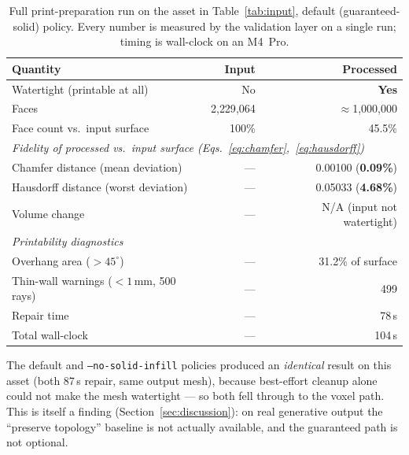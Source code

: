\documentclass[11pt,a4paper]{article}
\begin{document}
\begin{table}[h]
\centering
\caption{Full print-preparation run on the asset in Table~\ref{tab:input},
default (guaranteed-solid) policy. Every number is measured by the validation
layer on a single run; timing is wall-clock on an M4~Pro.}
\label{tab:results}
\begin{tabular}{lrr}
\toprule
\textbf{Quantity} & \textbf{Input} & \textbf{Processed} \\
\midrule
Watertight (printable at all)        & \textcolor{kaorange}{No}  & \textcolor{kalime}{\textbf{Yes}} \\
Faces                                & 2{,}229{,}064 & $\approx$1{,}000{,}000 \\
Face count vs.\ input surface        & 100\%         & 45.5\% \\
\midrule
\multicolumn{3}{l}{\emph{Fidelity of processed vs.\ input surface (Eqs.~\ref{eq:chamfer},~\ref{eq:hausdorff})}}\\
Chamfer distance (mean deviation)    & ---           & 0.00100 \;(\textbf{0.09\%}) \\
Hausdorff distance (worst deviation) & ---           & 0.05033 \;(\textbf{4.68\%}) \\
Volume change                        & ---           & N/A (input not watertight) \\
\midrule
\multicolumn{3}{l}{\emph{Printability diagnostics}}\\
Overhang area ($>45^\circ$)          & ---           & 31.2\% of surface \\
Thin-wall warnings ($<1$\,mm, 500 rays) & ---        & 499 \\
\midrule
Repair time                          & ---           & 78\,s \\
Total wall-clock                     & ---           & 104\,s \\
\bottomrule
\end{tabular}
\end{table}

\noindent
The default and \texttt{--no-solid-infill} policies produced an
\emph{identical} result on this asset (both 87\,s repair, same output mesh),
because best-effort cleanup alone could not make the mesh watertight --- so both
fell through to the voxel path. This is itself a finding
(Section~\ref{sec:discussion}): on real generative output the ``preserve
topology'' baseline is not actually available, and the guaranteed path is not
optional.
\end{document}
